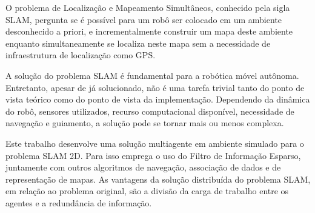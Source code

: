 O problema de Localização e Mapeamento Simultâneos, conhecido pela sigla SLAM, pergunta se é possível para um robô ser colocado em um ambiente 
desconhecido a priori, e incrementalmente construir um mapa deste 
ambiente enquanto simultaneamente se localiza neste mapa sem a 
necessidade de infraestrutura de localização como GPS.

A solução do problema SLAM é fundamental para a robótica móvel 
autônoma. Entretanto, apesar de já solucionado, não é uma tarefa trivial 
tanto do ponto de vista teórico como do ponto de vista da implementação. 
Dependendo da dinâmica do robô, sensores utilizados, recurso 
computacional disponível, necessidade de navegação e guiamento, a solução 
pode se tornar mais ou menos complexa.

Este trabalho desenvolve uma solução multiagente em ambiente simulado 
para o problema SLAM 2D. Para isso emprega o uso do Filtro de Informação 
Esparso, juntamente com outros algoritmos de navegação, associação de 
dados e de representação de mapas. As vantagens da solução distribuída do 
problema SLAM, em relação ao problema original, são a divisão da carga 
de trabalho entre os agentes e a redundância de informação.